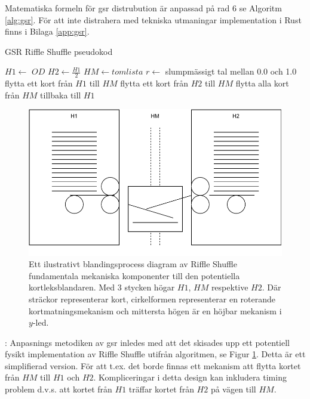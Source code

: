 \documentclass[swedish,a4paper]{article}
\begin{document}
Matematiska formeln för \gls{gsr} distrubution är anpassad på rad 6 se Algoritm
\ref{alg:gsr}. För att inte distrahera med tekniska utmaningar implementation i
Rust finns i Bilaga \ref{app:gsr}.

\begin{algorithm}
\caption{GSR Riffle Shuffle pseudokod}
\label{alg:gsr}
\begin{algorithmic}[1]
\State $H1 \gets$ $OD$ 
\State $H2 \gets \frac{H1}{2}$ 
\State $HM \gets tom lista$ 
\State $r \gets$ slumpmässigt tal mellan 0.0 och 1.0 
        \State flytta ett kort från $H1$ till $HM$
    \Else
        \State flytta ett kort från $H2$ till $HM$
    \EndIf
\EndWhile
\State flytta alla kort från $HM$ tillbaka till $H1$
\end{algorithmic}
\end{algorithm}
 
\begin{figure}
	\centering
	\includegraphics[width=0.85\linewidth]{irl_riffle_shuffle.pdf}
	\captionsetup{width=0.8\linewidth} \caption{Ett ilustrativt blandingsprocess
		diagram av
	Riffle Shuffle fundamentala mekaniska komponenter till den potentiella
	kortleksblandaren. Med 3 stycken högar $H1$, $HM$ respektive $H2$. Där sträckor representerar kort,
	cirkelformen representerar en roterande kortmatningsmekanism och mittersta
	högen är en höjbar mekanism i $y$-led.}
	\label{fig:irl_gsr}
\end{figure}
: Anpasnings metodiken av
\gls{gsr} inledes med att det skisades upp ett potentiell fysikt implementation av
Riffle Shuffle utifrån algoritmen, se Figur \ref{fig:irl_gsr}. Detta är ett
simplifierad version. För att t.ex. det borde finnas ett mekanism att flytta
kortet från $HM$ till $H1$ och $H2$. Kompliceringar i detta design kan inkludera
timing problem d.v.s. att kortet från $H1$ träffar kortet från $H2$ på vägen
till $HM$.
\end{document}
